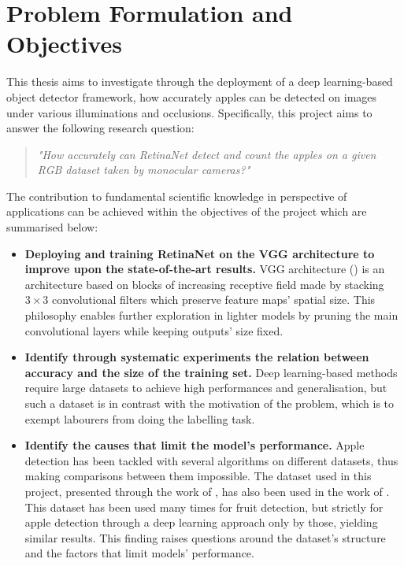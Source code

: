 \section{Problem Formulation and Objectives}
This thesis aims to investigate through the deployment of a deep learning-based object detector framework, how accurately apples can be detected on images under various illuminations and occlusions. Specifically, this project aims to answer the following research question:

\begin{quote}
\centering 
\textit{"How accurately can RetinaNet detect and count the apples on a given RGB dataset taken by monocular cameras?"}
\end{quote}

The contribution to fundamental scientific knowledge in perspective of applications can be achieved within the objectives of the project which are summarised below:

\begin{itemize}
\item \textbf{Deploying and training RetinaNet on the VGG architecture to improve upon the state-of-the-art results.} VGG architecture (\cite{simonyan2014very}) is an architecture based on blocks of increasing receptive field made by stacking $3\times3$ convolutional filters which preserve feature maps' spatial size. This philosophy enables further exploration in lighter models by pruning the main convolutional layers while keeping outputs' size fixed.  
\item \textbf{Identify through systematic experiments the relation between accuracy and the size of the training set.} Deep learning-based methods require large datasets to achieve high performances and generalisation, but such a dataset is in contrast with the motivation of the problem, which is to exempt labourers from doing the labelling task.
\item \textbf{Identify the causes that limit the model's performance.} Apple detection has been tackled with several algorithms on different datasets, thus making comparisons between them impossible. The dataset used in this project, presented through the work of \cite{bargoti2017deep}, has also been used in the work of \cite{liang2018apple}. This dataset has been used many times for fruit detection, but strictly for apple detection through a deep learning approach only by those, yielding similar results. This finding raises questions around the dataset's structure and the factors that limit models' performance.

\end{itemize}

